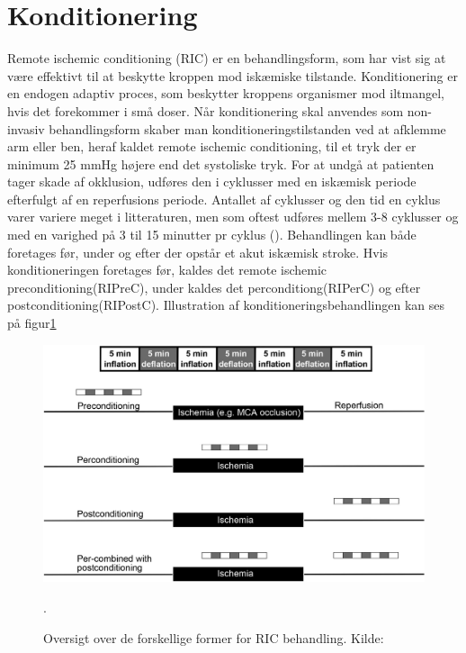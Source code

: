 \section{Konditionering}
Remote ischemic conditioning (RIC) er en behandlingsform, som har vist sig at være effektivt til at beskytte kroppen mod iskæmiske tilstande. Konditionering er en endogen adaptiv proces, som beskytter kroppens organismer mod iltmangel, hvis det forekommer i små doser. Når konditionering skal anvendes som non-invasiv behandlingsform skaber man konditioneringstilstanden ved at afklemme arm eller ben, heraf kaldet remote ischemic conditioning, til et tryk der er minimum 25 mmHg højere end det systoliske tryk. For at undgå at patienten tager skade af okklusion, udføres den i cyklusser med en iskæmisk periode efterfulgt af en reperfusions periode. Antallet af cyklusser og den tid en cyklus varer variere meget i litteraturen, men som oftest udføres mellem 3-8 cyklusser og med en varighed på 3 til 15 minutter pr cyklus (\cite{RefWorks:3}).
Behandlingen kan både foretages før, under og efter der opstår et akut iskæmisk stroke. Hvis konditioneringen foretages før, kaldes det remote ischemic preconditioning(RIPreC), under kaldes det perconditiong(RIPerC) og efter postconditioning(RIPostC). Illustration af konditioneringsbehandlingen kan ses på figur\ref{fig:cycles}

\begin{figure}[H]
	\includegraphics[width = \textwidth]{billeder/PrePerPostKonditionering.png}
	\caption{Oversigt over de forskellige former for RIC behandling. Kilde: \cite{RefWorks:3}}\label{fig:cycles}. 
\end{figure}

